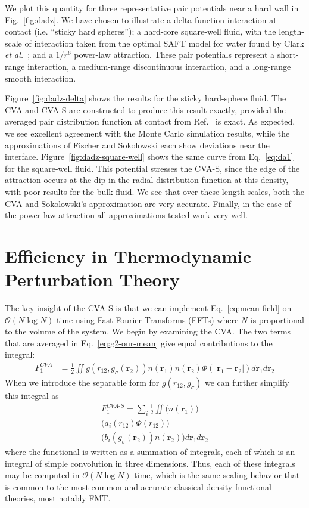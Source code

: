 \documentclass[letterpaper,twocolumn,amsmath,amssymb,pre,aps,10pt]{revtex4-1}
\newcommand{\rr}{\textbf{r}}
\begin{document}
We plot this quantity for three representative
pair potentials near a hard wall in Fig.~\ref{fig:dadz}.  We have
chosen to illustrate a delta-function interaction at contact
(i.e. ``sticky hard spheres''); a hard-core square-well fluid, with
the length-scale of interaction taken from the optimal SAFT model for
water found by Clark \emph{et al.}~\cite{clark2006developing}; and a
$1/r^6$ power-law attraction.  These pair potentials represent a
short-range interaction, a medium-range discontinuous interaction, and
a long-range smooth interaction.

Figure~\ref{fig:dadz-delta} shows the results for the sticky
hard-sphere fluid.  The CVA and CVA-S are constructed to produce this
result exactly, provided the averaged pair distribution function at
contact from Ref.~ is exact.  As expected,
we see excellent agreement with the Monte Carlo simulation results,
while the approximations of Fischer and Sokolowski each show
deviations near the interface.  Figure~\ref{fig:dadz-square-well}
shows the same curve from Eq.~\ref{eq:da1} for the square-well fluid.
This potential stresses the CVA-S, since the edge of the attraction
occurs at the dip in the radial distribution function at this density,
with poor results for the bulk fluid.  We see that over these length
scales, both the CVA and Sokolowski's approximation are very accurate.
Finally, in the case of the power-law attraction all approximations
tested work very well.

\section{Efficiency in Thermodynamic Perturbation Theory}

The key insight of the CVA-S is that we can implement
Eq.~\ref{eq:mean-field} on $\mathcal{O}(N\log N)$ time using Fast
Fourier Transforms (FFTs) where $N$ is proportional to the volume of
the system.  We begin by examining the CVA.  The two terms that are
averaged in Eq.~\ref{eq:g2-our-mean} give equal contributions to the integral:
\begin{align}
  F_1^{\textit{CVA}} &= \tfrac12 \!\! \iint \!\!
  g(r_{12},g_\sigma(\rr_2))n(\rr_1)n(\rr_2)\Phi(|\rr_1-\rr_2|)
  d\rr_1d\rr_2
\end{align}
When we introduce the separable form for $g(r_{12},g_\sigma)$ we can
further simplify this integral as
\begin{multline}
  F_1^{\textit{CVA-S}} =
  \sum_i \tfrac12 \!\! \iint \!\! \bigg( n(\rr_1)  \bigg) \\
                             \bigg( a_i(r_{12})\Phi(r_{12}) \bigg) \\
                             \bigg( b_i(g_\sigma(\rr_2))n(\rr_2) \bigg)
  d\rr_1d\rr_2
\end{multline}
where the functional is written as a summation of integrals, each of
which is an integral of simple convolution in three dimensions.  Thus,
each of these integrals may be computed in $\mathcal{O}(N\log N)$
time, which is the same scaling behavior that is common to the most
common and accurate classical density functional theories, most
notably FMT.
\end{document}
